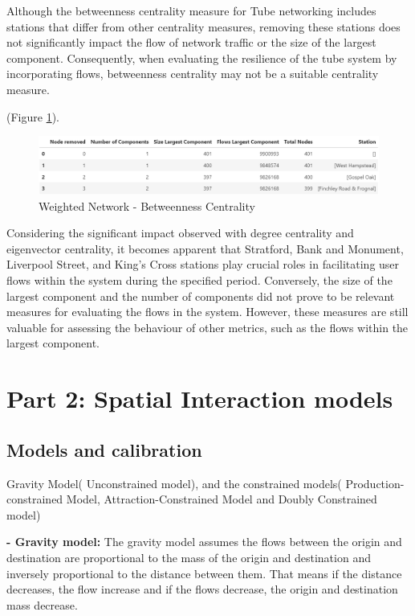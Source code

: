 \documentclass[10pt]{report}
\numberwithin{figure}{section}
\numberwithin{table}{section}
\begin{document}
Although the betweenness centrality measure for Tube networking includes stations that differ from other centrality measures, removing these stations does not significantly impact the flow of network traffic or the size of the largest component. Consequently, when evaluating the resilience of the tube system by incorporating flows, betweenness centrality may not be a suitable centrality measure.

(Figure \ref{fig:Table_Flows_Betweenness}). 
    \begin{figure}[htp]
        \centering
        \includegraphics[width=14cm]{Image/Table_Flows_Betweenness.png}
        \caption{Weighted Network - Betweenness Centrality}
        \label{fig:Table_Flows_Betweenness}
    \end{figure}

Considering the significant impact observed with degree centrality and eigenvector centrality, it becomes apparent that Stratford, Bank and Monument, Liverpool Street, and King's Cross stations play crucial roles in facilitating user flows within the system during the specified period. Conversely, the size of the largest component and the number of components did not prove to be relevant measures for evaluating the flows in the system. However, these measures are still valuable for assessing the behaviour of other metrics, such as the flows within the largest component.

\newpage 

\section{ Part 2: Spatial Interaction models}

\subsection{Models and calibration}

Gravity Model( Unconstrained model), and the constrained models( Production-constrained Model, Attraction-Constrained Model and Doubly Constrained model)

\vspace{5mm} %

\textbf{- Gravity model:}
The gravity model assumes the flows between the origin and destination are proportional to the mass of the origin and destination and inversely proportional to the distance between them. That means if the distance decreases, the flow increase and if the flows decrease, the origin and destination mass decrease\cite{wilson_family_1971, senior_gravity_1979}.
\end{document}
